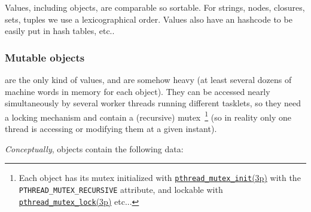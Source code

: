 Values, including objects, are comparable so sortable. For strings,
nodes, closures, sets, tuples we use a lexicographical order. Values
also have an hashcode to be easily put in hash tables, etc..

\subsubsection{Mutable objects}
\label{subsubsec:objects}

 are the only kind of 
values, and are somehow heavy (at least several dozens of machine words
in memory for each object). They can be accessed nearly simultaneously
by several worker threads running different tasklets, so they need a
locking mechanism and contain a (recursive) mutex~\footnote{Each
  object has its mutex initialized with
  \href{http://man7.org/linux/man-pages/man3/pthread\_mutex\_init.3p.html}{\texttt{pthread\_mutex\_init}(3p)}
  with the \texttt{PTHREAD\_MUTEX\_RECURSIVE} attribute, and lockable
  with
  \href{http://man7.org/linux/man-pages/man3/pthread\_mutex\_lock.3p.html}{\texttt{pthread\_mutex\_lock}(3p)}
  etc...} (so in reality only one thread is accessing or modifying
them at a given instant).

\medskip

\emph{Conceptually}, objects contain the following data:

